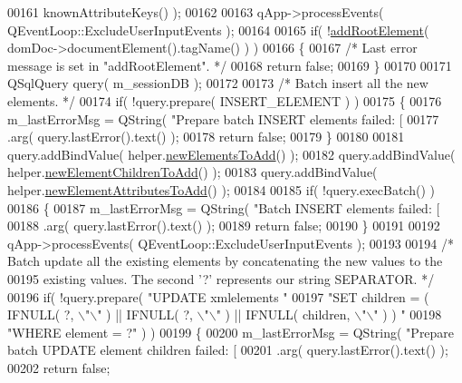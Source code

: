 \begin{DoxyCode}
{{00161                                  knownAttributeKeys() );
00162 
00163   qApp->processEvents( QEventLoop::ExcludeUserInputEvents );
00164 
00165   \textcolor{keywordflow}{if}( !\hyperlink{class_g_c_data_base_interface_a83ecf5fa6efc6650c834274e0e3b3aa5}{addRootElement}( domDoc->documentElement().tagName() ) )
00166   \{
00167     \textcolor{comment}{/* Last error message is set in "addRootElement". */}
00168     \textcolor{keywordflow}{return} \textcolor{keyword}{false};
00169   \}
00170 
00171   QSqlQuery query( m\_sessionDB );
00172 
00173   \textcolor{comment}{/* Batch insert all the new elements. */}
00174   \textcolor{keywordflow}{if}( !query.prepare( INSERT\_ELEMENT ) )
00175   \{
00176     m\_lastErrorMsg = QString( \textcolor{stringliteral}{"Prepare batch INSERT elements failed: [%
00177         .arg( query.lastError().text() );
00178     \textcolor{keywordflow}{return} \textcolor{keyword}{false};
00179   \}
00180 
00181   query.addBindValue( helper.\hyperlink{class_g_c_batch_processor_helper_afdedbc674698c019ebd2a3938a239661}{newElementsToAdd}() );
00182   query.addBindValue( helper.\hyperlink{class_g_c_batch_processor_helper_a89c14c3740c7cb57c937ef8db99b4af1}{newElementChildrenToAdd}() );
00183   query.addBindValue( helper.\hyperlink{class_g_c_batch_processor_helper_a640ca9bd78b7da0796fdfb82fefce8b6}{newElementAttributesToAdd}() );
00184 
00185   \textcolor{keywordflow}{if}( !query.execBatch() )
00186   \{
00187     m\_lastErrorMsg = QString( \textcolor{stringliteral}{"Batch INSERT elements failed: [%
00188         .arg( query.lastError().text() );
00189     \textcolor{keywordflow}{return} \textcolor{keyword}{false};
00190   \}
00191 
00192   qApp->processEvents( QEventLoop::ExcludeUserInputEvents );
00193 
00194   \textcolor{comment}{/* Batch update all the existing elements by concatenating the new values to
       the}
00195 \textcolor{comment}{    existing values. The second '?' represents our string SEPARATOR. */}
00196   \textcolor{keywordflow}{if}( !query.prepare( \textcolor{stringliteral}{"UPDATE xmlelements "}
00197                       \textcolor{stringliteral}{"SET children = ( IFNULL( ?, \(\backslash\)"\(\backslash\)" ) || IFNULL( ?, \(\backslash\)"\(\backslash\)" )
       || IFNULL( children, \(\backslash\)"\(\backslash\)" ) ) "}
00198                       \textcolor{stringliteral}{"WHERE element = ?"} ) )
00199   \{
00200     m\_lastErrorMsg = QString( \textcolor{stringliteral}{"Prepare batch UPDATE element children failed:
       [%
00201         .arg( query.lastError().text() );
00202     \textcolor{keywordflow}{return} \textcolor{keyword}{false};
}}}}}
\end{DoxyCode}
